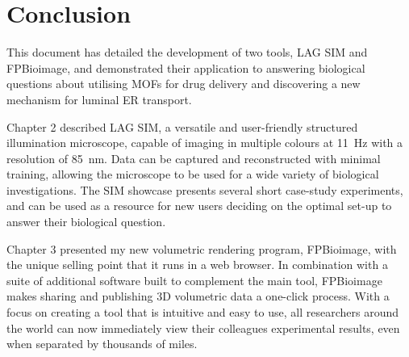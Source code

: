 \chapter{Conclusion}
\label{chap:conclusion}


\ifpdf
    \graphicspath{{Chapter6/Figs/Raster/}{Chapter6/Figs/PDF/}{Chapter6/Figs/}}
\else
    \graphicspath{{Chapter6/Figs/Vector/}{Chapter6/Figs/}}
\fi




This document has detailed the development of two tools, LAG SIM and FPBioimage, and demonstrated their application to answering biological questions about utilising MOFs for drug delivery and discovering a new mechanism for luminal ER transport. 

Chapter 2 described LAG SIM, a versatile and user-friendly structured illumination microscope, capable of imaging in multiple colours at \SI{11}{\hertz} with a resolution of \SI{85}{\nano\metre}. 
Data can be captured and reconstructed with minimal training, allowing the microscope to be used for a wide variety of biological investigations. 
The SIM showcase presents several short case-study experiments, and can be used as a resource for new users deciding on the optimal set-up to answer their biological question. 

Chapter 3 presented my new volumetric rendering program, FPBioimage, with the unique selling point that it runs in a web browser.
In combination with a suite of additional software built to complement the main tool, FPBioimage makes sharing and publishing 3D volumetric data a one-click process.  
With a focus on creating a tool that is intuitive and easy to use, all researchers around the world can now immediately view their colleagues experimental results, even when separated by thousands of miles. 

